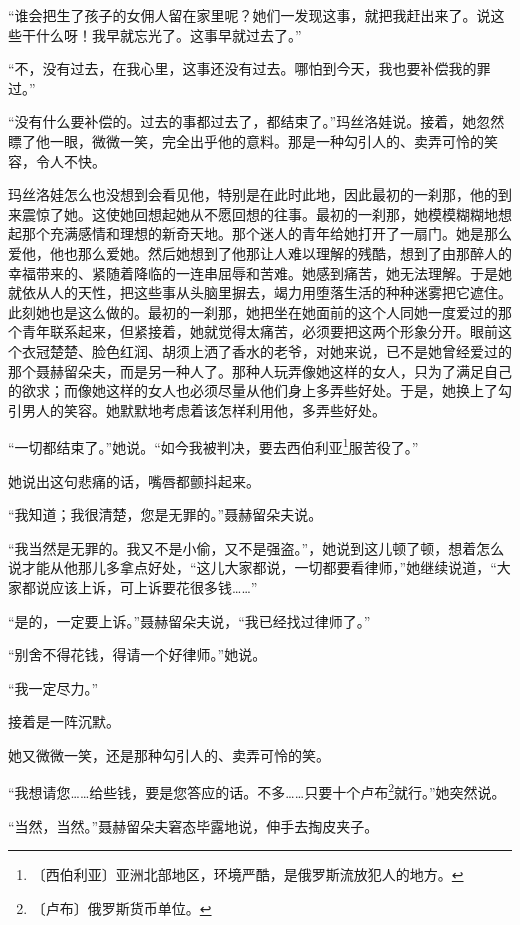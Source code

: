 \documentclass[12pt,UTF-8,openany]{ctexbook}
\begin{document}
\begin{large}
    “谁会把生了孩子的女佣人留在家里呢？她们一发现这事，就把我赶出来了。说这些干什么呀！我早就忘光了。这事早就过去了。”
    
    “不，没有过去，在我心里，这事还没有过去。哪怕到今天，我也要补偿我的罪过。”
    
    “没有什么要补偿的。过去的事都过去了，都结束了。”玛丝洛娃说。接着，她忽然瞟了他一眼，微微一笑，完全出乎他的意料。那是一种勾引人的、卖弄可怜的笑容，令人不快。
    
    玛丝洛娃怎么也没想到会看见他，特别是在此时此地，因此最初的一刹那，他的到来震惊了她。这使她回想起她从不愿回想的往事。最初的一刹那，她模模糊糊地想起那个充满感情和理想的新奇天地。那个迷人的青年给她打开了一扇门。她是那么爱他，他也那么爱她。然后她想到了他那让人难以理解的残酷，想到了由那醉人的幸福带来的、紧随着降临的一连串屈辱和苦难。她感到痛苦，她无法理解。于是她就依从人的天性，把这些事从头脑里摒去，竭力用堕落生活的种种迷雾把它遮住。此刻她也是这么做的。最初的一刹那，她把坐在她面前的这个人同她一度爱过的那个青年联系起来，但紧接着，她就觉得太痛苦，必须要把这两个形象分开。眼前这个衣冠楚楚、脸色红润、胡须上洒了香水的老爷，对她来说，已不是她曾经爱过的那个聂赫留朵夫，而是另一种人了。那种人玩弄像她这样的女人，只为了满足自己的欲求；而像她这样的女人也必须尽量从他们身上多弄些好处。于是，她换上了勾引男人的笑容。她默默地考虑着该怎样利用他，多弄些好处。
    
    “一切都结束了。”她说。“如今我被判决，要去西伯利亚\footnote{〔西伯利亚〕亚洲北部地区，环境严酷，是俄罗斯流放犯人的地方。}服苦役了。”
    
    她说出这句悲痛的话，嘴唇都颤抖起来。
    
    “我知道；我很清楚，您是无罪的。”聂赫留朵夫说。
    
    “我当然是无罪的。我又不是小偷，又不是强盗。”，她说到这儿顿了顿，想着怎么说才能从他那儿多拿点好处，“这儿大家都说，一切都要看律师，”她继续说道，“大家都说应该上诉，可上诉要花很多钱……”
    
    “是的，一定要上诉。”聂赫留朵夫说，“我已经找过律师了。”
    
    “别舍不得花钱，得请一个好律师。”她说。
    
    “我一定尽力。”
    
    接着是一阵沉默。
    
    她又微微一笑，还是那种勾引人的、卖弄可怜的笑。
    
    “我想请您……给些钱，要是您答应的话。不多……只要十个卢布\footnote{〔卢布〕俄罗斯货币单位。}就行。”她突然说。
    
    “当然，当然。”聂赫留朵夫窘态毕露地说，伸手去掏皮夹子。
    

\end{large}
\end{document}
